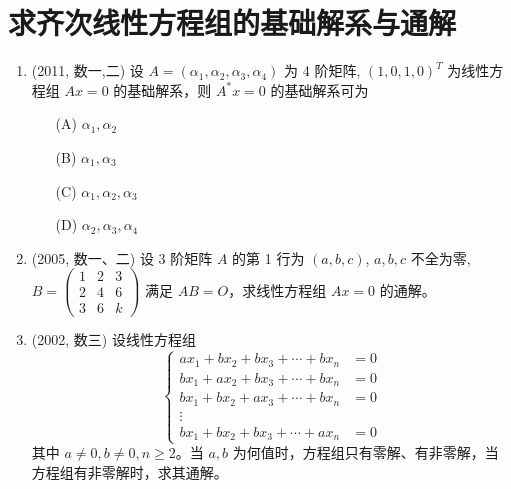 \documentclass[12pt, a4paper, oneside, UTF8]{ctexbook}
\begin{document}
\section{求齐次线性方程组的基础解系与通解}

\begin{enumerate}
    \item (2011, 数一,二) 设 $A = (\alpha_1, \alpha_2, \alpha_3, \alpha_4)$ 为 4 阶矩阵, $(1,0,1,0)^T$ 为线性方程组 $Ax = 0$ 的基础解系，则 $A^* x = 0$ 的基础解系可为
    \begin{enumerate}
        \item [(A)] $\alpha_1, \alpha_2$
        \item [(B)] $\alpha_1, \alpha_3$
        \item [(C)] $\alpha_1, \alpha_2, \alpha_3$
        \item [(D)] $\alpha_2, \alpha_3, \alpha_4$
    \end{enumerate}
    
    \begin{solution}
    \newpage
    \end{solution}
    
    \item (2005, 数一、二) 设 3 阶矩阵 $A$ 的第 1 行为 $(a, b, c)$, $a, b, c$ 不全为零, 
    $B = \begin{pmatrix} 1 & 2 &3 \\ 2 & 4 & 6 \\ 3 & 6 & k \end{pmatrix}$ 满足 $AB = O$，求线性方程组 $Ax = 0$ 的通解。
    
    \begin{solution}
    \newpage
    \end{solution}
    
    \item (2002, 数三) 设线性方程组
    \[
    \begin{cases}
    a x_1 + b x_2 + b x_3 + \cdots + b x_n &= 0 \\
    b x_1 + a x_2 + b x_3 + \cdots + b x_n &= 0 \\
    b x_1 + b x_2 + a x_3 + \cdots + b x_n &= 0 \\
    \vdots \\
    b x_1 + b x_2 + b x_3 + \cdots + a x_n &= 0
    \end{cases}
    \]
    其中 $a \neq 0, b \neq 0, n \geq 2$。当 $a, b$ 为何值时，方程组只有零解、有非零解，当方程组有非零解时，求其通解。
    
    \begin{solution}
    \newpage
    \end{solution}
\end{enumerate}
\end{document}
